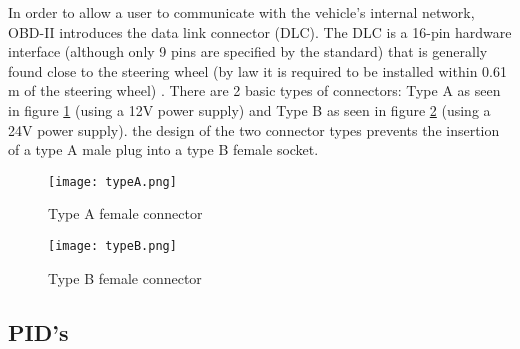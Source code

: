 In order to allow a user to communicate with the vehicle's internal network, OBD-II introduces the data link connector (DLC). The DLC is a 16-pin hardware interface (although only 9 pins are specified by the standard) that is generally found close to the steering wheel (by law it is required to be installed within 0.61 m of the steering wheel) \cite{wiki:OBD}. There are 2 basic types of connectors: Type A as seen in figure \ref{fig:typeA} (using a 12V power supply) and Type B as seen in figure \ref{fig:typeB} (using a 24V power supply). the design of the two connector types prevents the insertion of a type A male plug into a type B female socket.

\begin{figure}[h]
	\label{fig:typeA}
	\centering
	\texttt{[image: typeA.png]}
	\caption{Type A female connector \cite{wiki:OBD}}
\end{figure}

\begin{figure}[h]
	\label{fig:typeB}
	\centering
	\texttt{[image: typeB.png]}
	\caption{Type B female connector \cite{wiki:OBD}}
\end{figure}

\subsection{PID's}
\label{subsec:obd:pid}

